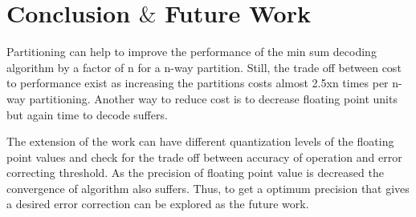 \chapter{Conclusion $\&$ Future Work}

\label{Chapter9} 


Partitioning can help to improve the performance of the min sum decoding algorithm by a factor of n for a n-way partition. Still, the trade off between cost to performance exist as increasing the partitions costs almost 2.5xn times per n-way partitioning. Another way to reduce cost is to decrease floating point units but again time to decode suffers. 

The extension of the work can have different quantization levels of the floating point values and check for the trade off between accuracy of operation and error correcting threshold.  As the precision of floating point value is decreased the convergence of algorithm also suffers. Thus, to get a optimum precision that gives a desired error correction can be explored as the future work. 